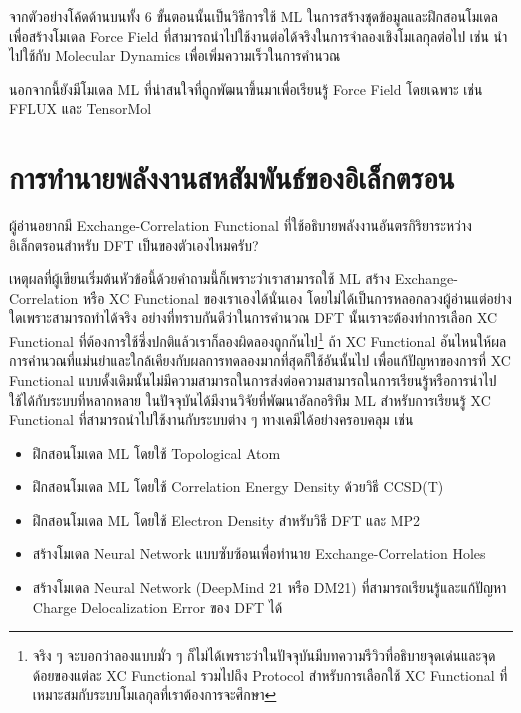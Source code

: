 \vspace{1em}

จากตัวอย่างโค้ดด้านบนทั้ง 6 ขั้นตอนนั้นเป็นวิธีการใช้ ML ในการสร้างชุดข้อมูลและฝึกสอนโมเดลเพื่อสร้างโมเดล Force Field ที่สามารถนำไปใช้งานต่อได้จริงในการจำลองเชิงโมเลกุลต่อไป เช่น นำไปใช้กับ Molecular Dynamics เพื่อเพิ่มความเร็วในการคำนวณ

นอกจากนี้ยังมีโมเดล ML ที่น่าสนใจที่ถูกพัฒนาขึ้นมาเพื่อเรียนรู้ Force Field โดยเฉพาะ เช่น FFLUX\autocite{hughes2019} และ TensorMol\autocite{yao2018}

\section{การทำนายพลังงานสหสัมพันธ์ของอิเล็กตรอน}
\label{sec:pred_corre_ener}

\begin{framed}
    ผู้อ่านอยากมี Exchange-Correlation Functional ที่ใช้อธิบายพลังงานอันตรกิริยาระหว่างอิเล็กตรอนสำหรับ DFT เป็นของตัวเองไหมครับ?
\end{framed}

เหตุผลที่ผู้เขียนเริ่มต้นหัวข้อนี้ด้วยคำถามนี้ก็เพราะว่าเราสามารถใช้ ML สร้าง Exchange-Correlation หรือ XC Functional ของเราเองได้นั่นเอง โดยไม่ได้เป็นการหลอกลวงผู้อ่านแต่อย่างใดเพราะสามารถทำได้จริง อย่างที่ทราบกันดีว่าในการคำนวณ DFT นั้นเราจะต้องทำการเลือก XC Functional ที่ต้องการใช้ซึ่งปกติแล้วเราก็ลองผิดลองถูกกันไป\footnote{จริง ๆ จะบอกว่าลองแบบมั่ว ๆ ก็ไม่ได้เพราะว่าในปัจจุบันมีบทความรีวิวที่อธิบายจุดเด่นและจุดด้อยของแต่ละ XC Functional รวมไปถึง Protocol สำหรับการเลือกใช้ XC Functional ที่เหมาะสมกับระบบโมเลกุลที่เราต้องการจะศึกษา} ถ้า XC Functional อันไหนให้ผลการคำนวณที่แม่นยำและใกล้เคียงกับผลการทดลองมากที่สุดก็ใช้อันนั้นไป เพื่อแก้ปัญหาของการที่ XC Functional แบบดั้งเดิมนั้นไม่มีความสามารถในการส่งต่อความสามารถในการเรียนรู้หรือการนำไปใช้ได้กับระบบที่หลากหลาย ในปัจจุบันได้มีงานวิจัยที่พัฒนาอัลกอริทึม ML สำหรับการเรียนรู้ XC Functional ที่สามารถนำไปใช้งานกับระบบต่าง ๆ ทางเคมีได้อย่างครอบคลุม เช่น
%
\begin{itemize}[topsep=0pt,noitemsep]\setlength\itemsep{0.5em}
    \item ฝึกสอนโมเดล ML โดยใช้ Topological Atom\autocite{mcdonagh2018}

    \item ฝึกสอนโมเดล ML โดยใช้ Correlation Energy Density ด้วยวิธี CCSD(T)\autocite{nudejima2019}

    \item ฝึกสอนโมเดล ML โดยใช้ Electron Density สำหรับวิธี DFT\autocite{dick2020} และ MP2\autocite{han2021}

    \item สร้างโมเดล Neural Network แบบซับซ้อนเพื่อทำนาย Exchange-Correlation Holes\autocite{cuierrier2021,cuierrier2022}

    \item สร้างโมเดล Neural Network (DeepMind 21 หรือ DM21) ที่สามารถเรียนรู้และแก้ปัญหา Charge Delocalization Error
          ของ DFT ได้\autocite{kirkpatrick2021}
\end{itemize}

